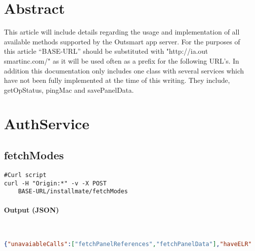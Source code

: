 \documentclass[
10pt, %
letterpaper, %
oneside, %
headinclude,footinclude, %
BCOR5mm, %
]{scrartcl}
\title{\normalfont\spacedallcaps{Installmate REST API}} %
\author{\spacedlowsmallcaps{Michael Meding* , mmeding@outsmartinc.com}} %
\date{} %
\begin{document}
\maketitle %

\setcounter{tocdepth}{2} %

\tableofcontents %

\thispagestyle{empty} %

 
\section*{Abstract}

 This article will include details regarding the usage and implementation of all available methods supported by the Outsmart app server. For the purposes of this article ``BASE-URL'' should be 
 substituted with "http://ia.out smartinc.com/" as it will be used often as a prefix for the following URL's.
 In addition this documentation only includes one class with several services which have not been fully implemented at the time of this writing. They include, getOpStatus, pingMac and savePanelData.
 



\section{AuthService}


\subsection{\textbf{fetchModes}}
\begin{lstlisting}
#Curl script
curl -H "Origin:*" -v -X POST
	BASE-URL/installmate/fetchModes
\end{lstlisting}

\paragraph{Output (JSON)}~
\begin{lstlisting}[language=json]
{"unavaiableCalls":["fetchPanelReferences","fetchPanelData"],"haveELR":true}
\end{lstlisting}
\end{document}

